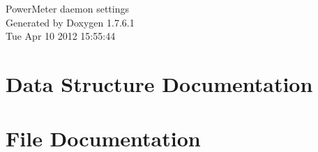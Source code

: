 \documentclass[a4paper]{book}
\begin{document}
\hypersetup{pageanchor=false,citecolor=blue}
\begin{titlepage}
\vspace*{7cm}
\begin{center}
{\Large \-Power\-Meter daemon settings }\\
\vspace*{1cm}
{\large \-Generated by Doxygen 1.7.6.1}\\
\vspace*{0.5cm}
{\small Tue Apr 10 2012 15:55:44}\\
\end{center}
\end{titlepage}
\clearemptydoublepage
{}
\tableofcontents
\clearemptydoublepage
{}
\hypersetup{pageanchor=true,citecolor=blue}
\chapter{\-Data \-Structure \-Documentation}










\chapter{\-File \-Documentation}






\printindex
\end{document}
